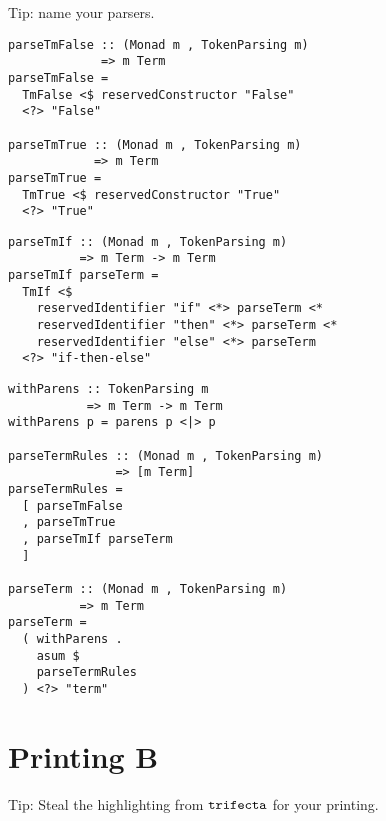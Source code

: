 \documentclass{beamer}
\begin{document}
\begin{frame}[c]
  \begin{center}
Tip: name your parsers.
  \end{center}
\end{frame}

\begin{frame}[fragile]
  \begin{verbatim}
parseTmFalse :: (Monad m , TokenParsing m)
             => m Term           
parseTmFalse =
  TmFalse <$ reservedConstructor "False"
  <?> "False"

parseTmTrue :: (Monad m , TokenParsing m)
            => m Term
parseTmTrue =
  TmTrue <$ reservedConstructor "True"
  <?> "True"
  \end{verbatim}
\end{frame} 

\begin{frame}[fragile]
  \begin{verbatim}
parseTmIf :: (Monad m , TokenParsing m)
          => m Term -> m Term
parseTmIf parseTerm =
  TmIf <$
    reservedIdentifier "if" <*> parseTerm <*
    reservedIdentifier "then" <*> parseTerm <*
    reservedIdentifier "else" <*> parseTerm
  <?> "if-then-else"
  \end{verbatim}
\end{frame} 

\begin{frame}[fragile]
  \begin{verbatim}
withParens :: TokenParsing m 
           => m Term -> m Term
withParens p = parens p <|> p

parseTermRules :: (Monad m , TokenParsing m)
               => [m Term]
parseTermRules =
  [ parseTmFalse
  , parseTmTrue
  , parseTmIf parseTerm
  ]

parseTerm :: (Monad m , TokenParsing m)
          => m Term
parseTerm =
  ( withParens .
    asum $
    parseTermRules
  ) <?> "term"
  \end{verbatim}
\end{frame} 

\section{Printing B}

\begin{frame}[c]
  \begin{center}
Tip: Steal the highlighting from $\tt{trifecta}$ for your printing.
  \end{center}
\end{frame}
\end{document}
